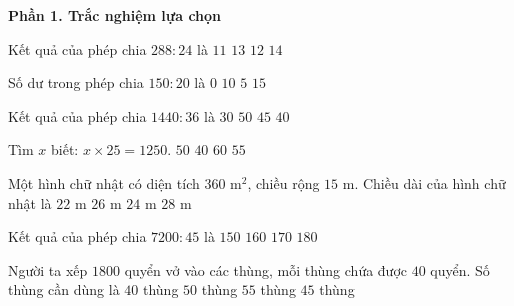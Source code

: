 \textbf{Phần 1. Trắc nghiệm lựa chọn}

\begin{ex} %
Kết quả của phép chia $288 : 24$ là
\choice
{$11$}
{$13$}
{\True $12$}
{$14$}
\end{ex}

\begin{ex} %
Số dư trong phép chia $150 : 20$ là
\choice
{$0$}
{\True $10$}
{$5$}
{$15$}
\end{ex}

\begin{ex} %
Kết quả của phép chia $1440 : 36$ là
\choice
{$30$}
{$50$}
{$45$}
{\True $40$}
\end{ex}

\begin{ex} %
Tìm $x$ biết: $x \times 25 = 1250$.
\choice
{\True $50$}
{$40$}
{$60$}
{$55$}
\end{ex}

\begin{ex} %
Một hình chữ nhật có diện tích $360\text{ m}^2$, chiều rộng $15\text{ m}$. Chiều dài của hình chữ nhật là
\choice
{$22\text{ m}$}
{$26\text{ m}$}
{\True $24\text{ m}$}
{$28\text{ m}$}
\end{ex}

\begin{ex} %
Kết quả của phép chia $7200 : 45$ là
\choice
{$150$}
{\True $160$}
{$170$}
{$180$}
\end{ex}

\begin{ex} %
Người ta xếp $1800$ quyển vở vào các thùng, mỗi thùng chứa được $40$ quyển. Số thùng cần dùng là
\choice
{$40$ thùng}
{$50$ thùng}
{$55$ thùng}
{\True $45$ thùng}
\end{ex}

